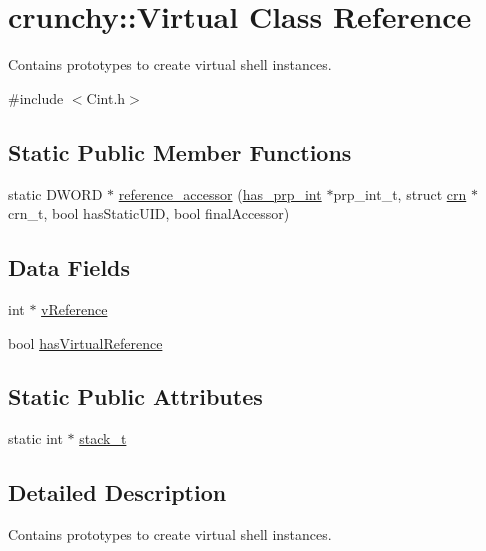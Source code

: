 \hypertarget{classcrunchy_1_1_virtual}{}\section{crunchy\+:\+:Virtual Class Reference}
\label{classcrunchy_1_1_virtual}


Contains prototypes to create virtual shell instances.  




{\ttfamily \#include $<$Cint.\+h$>$}

\subsection*{Static Public Member Functions}
\begin{DoxyCompactItemize}
\item 
static D\+W\+O\+R\+D $\ast$ \hyperlink{classcrunchy_1_1_virtual_a5021e8883bb9698a2f6018323b68355f}{reference\+\_\+accessor} (\hyperlink{structcrunchy_1_1has__prp__int}{has\+\_\+prp\+\_\+int} $\ast$prp\+\_\+int\+\_\+t, struct \hyperlink{structcrunchy_1_1crn}{crn} $\ast$crn\+\_\+t, bool has\+Static\+U\+I\+D, bool final\+Accessor)
\end{DoxyCompactItemize}
\subsection*{Data Fields}
\begin{DoxyCompactItemize}
\item 
int $\ast$ \hyperlink{classcrunchy_1_1_virtual_acf317286283a3916ccb1d4752074af5f}{v\+Reference}
\item 
bool \hyperlink{classcrunchy_1_1_virtual_a9dd9b11712ab44b00696838fc1da2c43}{has\+Virtual\+Reference}
\end{DoxyCompactItemize}
\subsection*{Static Public Attributes}
\begin{DoxyCompactItemize}
\item 
static int $\ast$ \hyperlink{classcrunchy_1_1_virtual_ad108e31577fcad0d6ff9ff6d7b3d5249}{stack\+\_\+t}
\end{DoxyCompactItemize}


\subsection{Detailed Description}
Contains prototypes to create virtual shell instances. 


